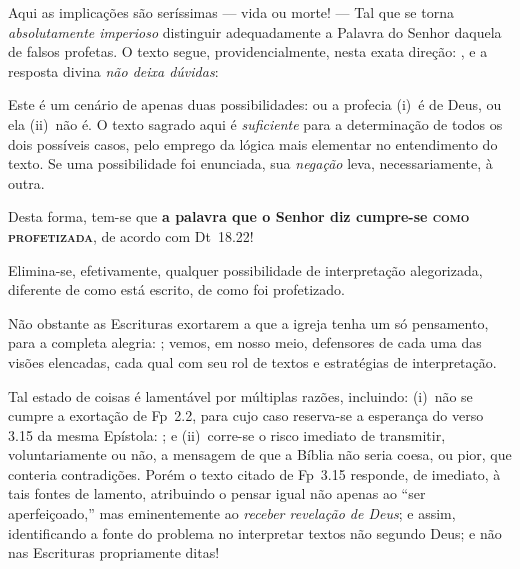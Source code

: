     Aqui as implicações são seríssimas --- vida ou morte!  ---  Tal  que  se  torna  \emph{absolutamente  imperioso}  distinguir
    adequadamente a Palavra do Senhor daquela de falsos  profetas.  O  texto  segue,  providencialmente,  nesta  exata  direção:
    ,  e  a  resposta
    divina \emph{não deixa dúvidas}:


    Este é um cenário de apenas duas possibilidades: ou a profecia (i)~é de Deus, ou ela (ii)~não é.  O  texto  sagrado  aqui  é
    \emph{suficiente} para a determinação de  todos  os  dois  possíveis  casos,  pelo  emprego  da  lógica  mais  elementar  no
    entendimento do texto. Se uma possibilidade foi enunciada, sua \emph{negação} leva, necessariamente, à outra.

    Desta forma, tem-se que \textbf{a palavra que o Senhor diz cumpre-se \textsc{como profetizada}}, de acordo com Dt~18.22!

    Elimina-se, efetivamente, qualquer possibilidade de interpretação alegorizada, diferente de como está escrito, de como foi
    profetizado.







    Não obstante as Escrituras exortarem a que a igreja tenha um só pensamento, para a completa alegria: ; vemos, em nosso meio, defensores de cada uma das visões elencadas,  cada  qual  com  seu  rol  de
    textos e estratégias de interpretação.

    Tal estado de coisas é lamentável por múltiplas razões, incluindo: (i)~não se cumpre a exortação de Fp~2.2, para  cujo  caso
    reserva-se a esperança do verso 3.15 da mesma Epístola: ; e  (ii)~corre-se
    o risco imediato de transmitir, voluntariamente ou não, a mensagem de que a Bíblia não seria coesa, ou  pior,  que  conteria
    contradições. Porém o texto citado de Fp~3.15 responde, de imediato, à tais fontes de lamento, atribuindo o pensar igual não
    apenas ao ``ser aperfeiçoado,'' mas eminentemente ao \emph{receber revelação de Deus}; e assim,  identificando  a  fonte  do
    problema no interpretar textos não segundo Deus; e não nas Escrituras propriamente ditas!

